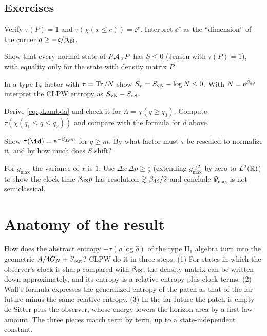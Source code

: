 \subsection*{Exercises}
\begin{exercise}\label{ex:clpw:1}
Verify $\tau(P)=1$ and $\tau(\chi(x\le c))=\ee^{c}$. Interpret $\ee^c$ as the ``dimension'' of the corner $q\ge-c/\beta_{\rm dS}$.
\end{exercise}
\begin{exercise}\label{ex:clpw:2}
Show that every normal state of $P\mathcal{A}_{\rm cr}P$ has $S\le0$ (Jensen with $\tau(P)=1$), with equality only for the state with density matrix $P$.
\end{exercise}
\begin{exercise}\label{ex:clpw:3}
In a type I$_N$ factor with $\tau=\operatorname{Tr}/N$ show $S_\tau=S_{\rm vN}-\log N\le0$. With $N=\mathrm{e}^{S_{\rm dS}}$ interpret the CLPW entropy as $S_{\rm vN}-S_{\rm dS}$.
\end{exercise}
\begin{exercise}\label{ex:clpw:4}
Derive \eqref{eq:pLambda} and check it for $\Lambda=\chi(q\ge q_0)$. Compute $\tau(\chi(q_1\le q\le q_2))$ and compare with the formula for $d$ above.
\end{exercise}
\begin{exercise}\label{ex:clpw:5}
Show $\tau(\id)=\ee^{-\beta_{\rm dS}m}$ for $q\ge m$. By what factor must $\tau$ be rescaled to normalize it, and by how much does $S$ shift?
\end{exercise}
\begin{exercise}\label{ex:clpw:6}
For $g_{\max}$ the variance of $x$ is $1$. Use $\Delta x\,\Delta p\ge\frac12$ (extending $g_{\max}^{1/2}$ by zero to $L^2(\mathbb{R})$) to show the clock time $\beta_{\rm dS}p$ has resolution $\gtrsim\beta_{\rm dS}/2$ and conclude $\Psi_{\max}$ is not semiclassical.
\end{exercise}

\section{Anatomy of the result}\label{ch:anatomy}

\begin{physmotiv}
How does the abstract entropy $-\tau(\hat\rho\log\hat\rho)$ of the type II$_1$ algebra turn into the geometric $A/4G_N+S_{\rm out}$? CLPW \cite{CLPW2023} do it in three steps. (1) For states in which the observer's clock is sharp compared with $\beta_{\rm dS}$, the density matrix can be written down approximately, and its entropy is a relative entropy plus clock terms. (2) Wall's formula expresses the generalized entropy of the patch as that of the far future minus the same relative entropy. (3) In the far future the patch is empty de Sitter plus the observer, whose energy lowers the horizon area by a first-law amount. The three pieces match term by term, up to a state-independent constant.
\end{physmotiv}

